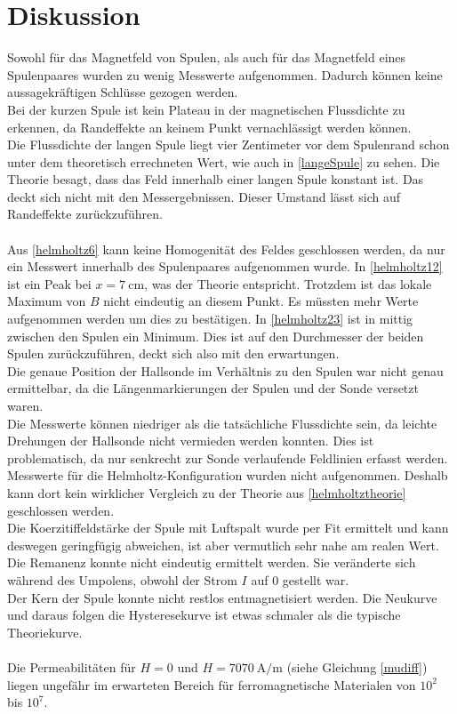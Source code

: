 \section{Diskussion}
\label{sec:Diskussion}

Sowohl für das Magnetfeld von Spulen, als auch für das Magnetfeld eines Spulenpaares wurden zu wenig Messwerte aufgenommen.
Dadurch können keine aussagekräftigen Schlüsse gezogen werden.\\
Bei der kurzen Spule ist kein Plateau in der magnetischen Flussdichte zu erkennen, da Randeffekte an keinem
Punkt vernachlässigt werden können. \\
Die Flussdichte der langen Spule liegt vier Zentimeter vor dem Spulenrand schon unter dem theoretisch errechneten Wert, wie auch in
\autoref{langeSpule} zu sehen. Die Theorie besagt, dass das Feld innerhalb einer langen Spule
konstant ist. Das deckt sich nicht mit den Messergebnissen. Dieser Umstand lässt sich auf Randeffekte zurückzuführen.\\
\\
Aus \autoref{helmholtz6} kann keine Homogenität des Feldes geschlossen werden, da nur ein Messwert innerhalb des
Spulenpaares aufgenommen wurde. In \autoref{helmholtz12} ist ein Peak bei $x = \SI{7}{\centi\meter}$, was der Theorie entspricht.
Trotzdem ist das lokale Maximum von $B$ nicht eindeutig an diesem Punkt. Es müssten mehr Werte aufgenommen werden um dies zu bestätigen.
In \autoref{helmholtz23} ist in mittig zwischen den Spulen ein Minimum. Dies ist auf den Durchmesser der beiden Spulen 
zurückzuführen, deckt sich also mit den erwartungen.\\
Die genaue Position der Hallsonde im Verhältnis zu den Spulen war nicht genau ermittelbar, da die Längenmarkierungen der Spulen und der Sonde
versetzt waren.\\
Die Messwerte können niedriger als die tatsächliche Flussdichte sein, da leichte Drehungen der Hallsonde nicht vermieden werden konnten.
Dies ist problematisch, da nur senkrecht zur Sonde verlaufende Feldlinien erfasst werden.
Messwerte für die Helmholtz-Konfiguration wurden nicht aufgenommen. Deshalb kann dort kein wirklicher Vergleich zu der Theorie aus \autoref{helmholtztheorie} geschlossen werden.
\\
Die Koerzitiffeldstärke der Spule mit Luftspalt wurde per Fit ermittelt und kann deswegen geringfügig abweichen, ist aber 
vermutlich sehr nahe am realen Wert.\\
Die Remanenz konnte nicht eindeutig ermittelt werden. Sie veränderte sich während des Umpolens, obwohl der Strom $I$ auf 0 gestellt war.\\
Der Kern der Spule konnte nicht restlos entmagnetisiert werden. Die Neukurve und daraus folgen die Hysteresekurve ist etwas schmaler als die typische Theoriekurve.\\
\\
Die Permeabilitäten für $H = 0$ und $H = \SI{7070}{\ampere\per\meter}$ (siehe Gleichung \eqref{mudiff}) liegen ungefähr im erwarteten Bereich für ferromagnetische Materialen
von $10^2$ bis $10^7$. 


\newpage
